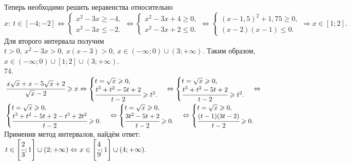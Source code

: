 \documentclass[12pt]{article}
\begin{document}
Теперь необходимо решить неравенства относительно $x:\ t\in[-4;-2]\Leftrightarrow\begin{cases} x^2-3x\geqslant-4,\\ x^2-3x\leqslant-2.\end{cases}
\Leftrightarrow\begin{cases} x^2-3x+4\geqslant0,\\ x^2-3x+2\leqslant0.\end{cases}\Leftrightarrow
\begin{cases} (x-1,5)^2+1,75\geqslant0,\\ (x-2)(x-1)\leqslant0.\end{cases}\Rightarrow x\in[1;2].$ Для второго интервала получим $t>0,\ x^2-3x>0,\ x(x-3)>0,\
x\in(-\infty;0)\cup(3;+\infty).$ Таким образом,  $x\in(-\infty;0)\cup[1;2]\cup(3;+\infty).$\\
74. $\cfrac{x\sqrt{x}+x-5\sqrt{x}+2}{\sqrt{x}-2}\geqslant x \Leftrightarrow \begin{cases} t=\sqrt{x}\geqslant0,\\ \cfrac{t^3+t^2-5t+2}{t-2}\geqslant t^2.\end{cases}
\Leftrightarrow \begin{cases} t=\sqrt{x}\geqslant0,\\ \cfrac{t^3+t^2-5t+2}{t-2}\geqslant t^2.\end{cases}
\Leftrightarrow$\\$ \begin{cases} t=\sqrt{x}\geqslant0,\\ \cfrac{t^3+t^2-5t+2-t^3+2t^2}{t-2}\geqslant 0.\end{cases}
\Leftrightarrow \begin{cases} t=\sqrt{x}\geqslant0,\\ \cfrac{3t^2-5t+2}{t-2}\geqslant 0.\end{cases}
\Leftrightarrow \begin{cases} t=\sqrt{x}\geqslant0,\\ \cfrac{(t-1)(3t-2)}{t-2}\geqslant 0.\end{cases}$ Применив метод интервалов, найдём ответ: $t\in\left[\cfrac{2}{3};1\right]\cup(2;+\infty)\Leftrightarrow x \in\left[\cfrac{4}{9};1\right]\cup(4;+\infty).$
\begin{figure}[ht!]
\end{figure}\\
\end{document}
